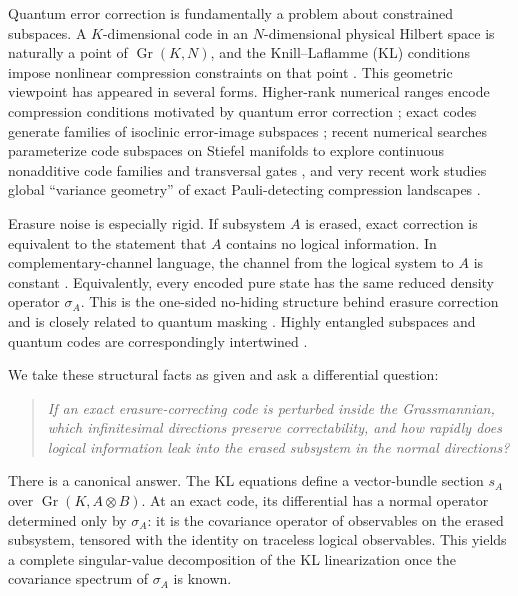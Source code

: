 \documentclass[11pt]{article}
\theoremstyle{definition}
\newcommand{\Gr}{\operatorname{Gr}}
\newcommand{\1}{\mathbf 1}
\begin{document}
Quantum error correction is fundamentally a problem about constrained subspaces.  A $K$-dimensional code in an $N$-dimensional physical Hilbert space is naturally a point of $\Gr(K,N)$, and the Knill--Laflamme (KL) conditions impose nonlinear compression constraints on that point \cite{KnillLaflamme1997}.  This geometric viewpoint has appeared in several forms.  Higher-rank numerical ranges encode compression conditions motivated by quantum error correction \cite{ChoiKribsZyczkowski2005}; exact codes generate families of isoclinic error-image subspaces \cite{KribsMammarellaPereira2019}; recent numerical searches parameterize code subspaces on Stiefel manifolds to explore continuous nonadditive code families and transversal gates \cite{DuZhangPoonZeng2024,ZhangWuHuangZeng2025}, and very recent work studies global ``variance geometry'' of exact Pauli-detecting compression landscapes \cite{GuptaSunHeZeng2026}.

Erasure noise is especially rigid.  If subsystem $A$ is erased, exact correction is equivalent to the statement that $A$ contains no logical information.  In complementary-channel language, the channel from the logical system to $A$ is constant \cite{KretschmannKribsSpekkens2007,BenyOreshkov2009}.  Equivalently, every encoded pure state has the same reduced density operator $\sigma_A$.  This is the one-sided no-hiding structure behind erasure correction and is closely related to quantum masking \cite{BraunsteinPati2006,HanEtAl2020}.  Highly entangled subspaces and quantum codes are correspondingly intertwined \cite{GourWallach2007}.

We take these structural facts as given and ask a differential question:

\begin{quote}
\emph{If an exact erasure-correcting code is perturbed inside the Grassmannian, which infinitesimal directions preserve correctability, and how rapidly does logical information leak into the erased subsystem in the normal directions?}
\end{quote}

There is a canonical answer.  The KL equations define a vector-bundle section $s_A$ over $\Gr(K,A\otimes B)$.  At an exact code, its differential has a normal operator determined only by $\sigma_A$: it is the covariance operator of observables on the erased subsystem, tensored with the identity on traceless logical observables.  This yields a complete singular-value decomposition of the KL linearization once the covariance spectrum of $\sigma_A$ is known.
\end{document}
